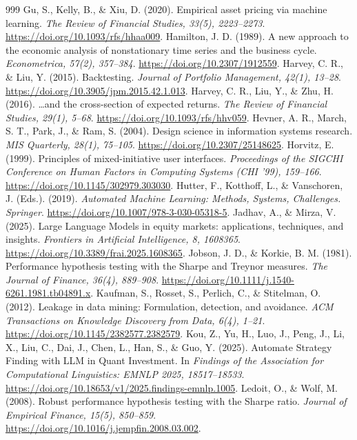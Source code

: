 \documentclass[analytics,article,submit,pdftex,moreauthors]{Definitions/mdpi}
\begin{document}
\begin{thebibliography}{999}
 Gu, S., Kelly, B., \& Xiu, D. (2020). Empirical asset pricing via machine learning. \emph{The Review of Financial Studies, 33(5), 2223--2273}. \url{https://doi.org/10.1093/rfs/hhaa009}.
 Hamilton, J. D. (1989). A new approach to the economic analysis of nonstationary time series and the business cycle. \emph{Econometrica, 57(2), 357--384}. \url{https://doi.org/10.2307/1912559}.
 Harvey, C. R., \& Liu, Y. (2015). Backtesting. \emph{Journal of Portfolio Management, 42(1), 13--28}. \url{https://doi.org/10.3905/jpm.2015.42.1.013}.
 Harvey, C. R., Liu, Y., \& Zhu, H. (2016). \ldots and the cross-section of expected returns. \emph{The Review of Financial Studies, 29(1), 5--68}. \url{https://doi.org/10.1093/rfs/hhv059}.
 Hevner, A. R., March, S. T., Park, J., \& Ram, S. (2004). Design science in information systems research. \emph{MIS Quarterly, 28(1), 75--105}. \url{https://doi.org/10.2307/25148625}.
 Horvitz, E. (1999). Principles of mixed-initiative user interfaces. \emph{Proceedings of the SIGCHI Conference on Human Factors in Computing Systems (CHI '99), 159--166}. \url{https://doi.org/10.1145/302979.303030}.
 Hutter, F., Kotthoff, L., \& Vanschoren, J. (Eds.). (2019). \emph{Automated Machine Learning: Methods, Systems, Challenges. Springer}. \url{https://doi.org/10.1007/978-3-030-05318-5}.
 Jadhav, A., \& Mirza, V. (2025). Large Language Models in equity markets: applications, techniques, and insights. \emph{Frontiers in Artificial Intelligence, 8, 1608365}. \url{https://doi.org/10.3389/frai.2025.1608365}.
 Jobson, J. D., \& Korkie, B. M. (1981). Performance hypothesis testing with the Sharpe and Treynor measures. \emph{The Journal of Finance, 36(4), 889--908}. \url{https://doi.org/10.1111/j.1540-6261.1981.tb04891.x}.
 Kaufman, S., Rosset, S., Perlich, C., \& Stitelman, O. (2012). Leakage in data mining: Formulation, detection, and avoidance. \emph{ACM Transactions on Knowledge Discovery from Data, 6(4), 1--21}. \url{https://doi.org/10.1145/2382577.2382579}.
 Kou, Z., Yu, H., Luo, J., Peng, J., Li, X., Liu, C., Dai, J., Chen, L., Han, S., \& Guo, Y. (2025). Automate Strategy Finding with LLM in Quant Investment. In \emph{Findings of the Association for Computational Linguistics: EMNLP 2025, 18517--18533}. \url{https://doi.org/10.18653/v1/2025.findings-emnlp.1005}.
 Ledoit, O., \& Wolf, M. (2008). Robust performance hypothesis testing with the Sharpe ratio. \emph{Journal of Empirical Finance, 15(5), 850--859}. \url{https://doi.org/10.1016/j.jempfin.2008.03.002}.

\end{thebibliography}
\end{document}
